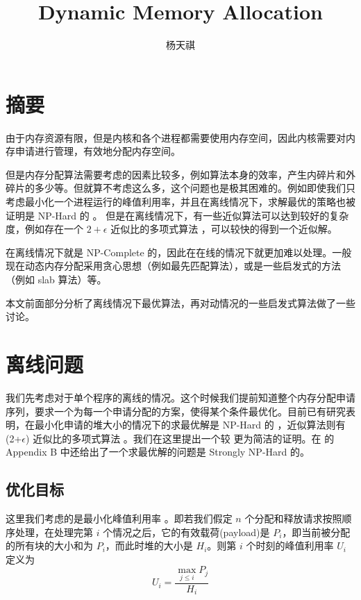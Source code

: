 \documentclass{noiassignment}
\title{Dynamic Memory Allocation}
\author{杨天祺}
\begin{document}
	\maketitle

	\tableofcontents

	\newpage

	\section{摘要}
	由于内存资源有限，但是内核和各个进程都需要使用内存空间，因此内核需要对内存申请进行管理，有效地分配内存空间。

	但是内存分配算法需要考虑的因素比较多，例如算法本身的效率，产生内碎片和外碎片的多少等。但就算不考虑这么多，这个问题也是极其困难的。例如即使我们只考虑最小化一个进程运行的峰值利用率，并且在离线情况下，求解最优的策略也被证明是 NP-Hard 的 \cite{opt-nph}。
	但是在离线情况下，有一些近似算法可以达到较好的复杂度，例如存在一个 $2 + \epsilon$ 近似比的多项式算法 \cite{M2015A}，可以较快的得到一个近似解。

	在离线情况下就是 NP-Complete 的，因此在在线的情况下就更加难以处理。一般现在动态内存分配采用贪心思想（例如最先匹配算法），或是一些启发式的方法（例如 slab 算法\cite{bonwick1994slab}）等。

	本文前面部分分析了离线情况下最优算法，再对动情况的一些启发式算法做了一些讨论。

	\section{离线问题}
	我们先考虑对于单个程序的离线的情况。这个时候我们提前知道整个内存分配申请序列，要求一个为每一个申请分配的方案，使得某个条件最优化。目前已有研究表明，在最小化申请的堆大小的情况下的求最优解是 NP-Hard 的 \cite{opt-nph}，近似算法则有 (2+$\epsilon$) 近似比的多项式算法 \cite{M2015A}。我们在这里提出一个较 \cite{opt-nph} 更为简洁的证明。在 \cite{bar2017constant} 的 Appendix B 中还给出了一个求最优解的问题是 Strongly NP-Hard 的。

	\subsection{优化目标}

	这里我们考虑的是最小化峰值利用率 \cite{Bryant:2015:CSP:2846227}。即若我们假定 $n$ 个分配和释放请求按照顺序处理，在处理完第 $i$ 个情况之后，它的有效载荷(payload)是 $P_i$，即当前被分配的所有块的大小和为 $P_i$，而此时堆的大小是 $H_i$。则第 $i$ 个时刻的峰值利用率 $U_i$ 定义为
	$$
	U_i = \frac{\max_{j \le i} P_j}{H_i}
	$$
\end{document}
